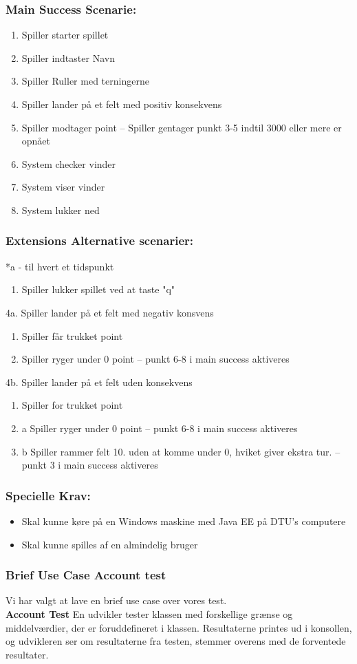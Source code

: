 \subsubsection*{Main Success Scenarie:}
\begin{enumerate}
\item Spiller starter spillet
\item Spiller indtaster Navn
\item Spiller Ruller med terningerne
\item Spiller lander på et felt med positiv konsekvens
\item Spiller modtager point
-- Spiller gentager punkt 3-5 indtil 3000 eller mere er opnået
\item System checker vinder
\item System viser vinder
\item System lukker ned
\end{enumerate}
\subsubsection*{Extensions Alternative scenarier:}
*a - til hvert et tidspunkt
\begin{enumerate}
\item Spiller lukker spillet ved at taste "q"
\end{enumerate}
4a. Spiller lander på et felt med negativ konsvens
\begin{enumerate}
\item Spiller får trukket point
\item Spiller ryger under 0 point
-- punkt 6-8 i main success aktiveres
\end{enumerate}
4b. Spiller lander på et felt uden konsekvens
\begin{enumerate}
\item Spiller for trukket point
\item a Spiller ryger under 0 point
-- punkt 6-8 i main success aktiveres
\item b Spiller rammer felt 10. uden at komme under 0, hviket giver ekstra tur. 
-- punkt 3 i main success aktiveres
\end{enumerate}
\subsubsection*{Specielle Krav:}
\begin{itemize}
\item Skal kunne køre på en Windows maskine med Java EE på DTU's computere
\item Skal kunne spilles af en almindelig bruger
\end{itemize}
\subsubsection{Brief Use Case Account test}
Vi har valgt at lave en brief use case over vores test.
\\

\textbf{Account Test}
En udvikler tester klassen med forskellige grænse og middelværdier, der er foruddefineret i klassen. Resultaterne printes ud i konsollen, og udvikleren ser om resultaterne fra testen, stemmer overens med de forventede resultater.